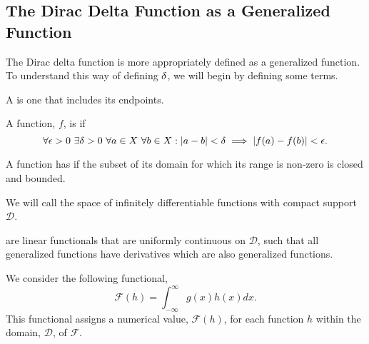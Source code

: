 \subsection{The Dirac Delta Function as a Generalized Function}
The Dirac delta function is more appropriately defined as a generalized function. To understand this way of defining \(\delta\), we will begin by defining some terms.

\begin{definition}
     A  is one that includes its endpoints.
\end{definition}

\begin{definition}
    A function, \(f\), is  if 
    \begin{equation}
        \forall \epsilon > 0 ~ \exists \delta > 0 ~ \forall a \in X ~ \forall b \in X: |a-b| < \delta \implies |f(a) - f(b)| < \epsilon.
    \end{equation}
\end{definition}

\begin{definition}
    A function has  if the subset of its domain for which its range is non-zero is closed and bounded.
\end{definition}
We will call the space of infinitely differentiable functions with compact support \(\mathcal{D}\).

\begin{definition}
     are linear functionals that are uniformly continuous on \(\mathcal{D}\), such that all generalized functions have derivatives which are also generalized functions.
\end{definition}

We consider the following functional,
\begin{equation}
    \mathcal{F}(h) = \int_{-\infty}^{\infty} g(x)h(x)dx.
\end{equation}
This functional assigns a numerical value, \(\mathcal{F}(h)\), for each function \(h\) within the domain, \(\mathcal{D}\), of \(\mathcal{F}\).

